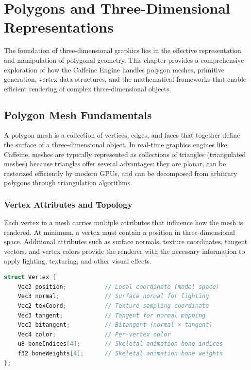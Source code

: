 \chapter{Polygons and Three-Dimensional Representations}

The foundation of three-dimensional graphics lies in the effective representation and manipulation of polygonal geometry. This chapter provides a comprehensive exploration of how the Caffeine Engine handles polygon meshes, primitive generation, vertex data structures, and the mathematical frameworks that enable efficient rendering of complex three-dimensional objects.

\section{Polygon Mesh Fundamentals}

A polygon mesh is a collection of vertices, edges, and faces that together define the surface of a three-dimensional object. In real-time graphics engines like Caffeine, meshes are typically represented as collections of triangles (triangulated meshes) because triangles offer several advantages: they are planar, can be rasterized efficiently by modern GPUs, and can be decomposed from arbitrary polygons through triangulation algorithms.

\subsection{Vertex Attributes and Topology}

Each vertex in a mesh carries multiple attributes that influence how the mesh is rendered. At minimum, a vertex must contain a position in three-dimensional space. Additional attributes such as surface normals, texture coordinates, tangent vectors, and vertex colors provide the renderer with the necessary information to apply lighting, texturing, and other visual effects.

\begin{lstlisting}[language=C++, caption=Standard Vertex Structure]
struct Vertex {
    Vec3 position;           // Local coordinate (model space)
    Vec3 normal;             // Surface normal for lighting
    Vec2 texCoord;           // Texture sampling coordinate
    Vec3 tangent;            // Tangent for normal mapping
    Vec3 bitangent;          // Bitangent (normal × tangent)
    Vec4 color;              // Per-vertex color
    u8 boneIndices[4];       // Skeletal animation bone indices
    f32 boneWeights[4];      // Skeletal animation bone weights
};
\end{lstlisting}

